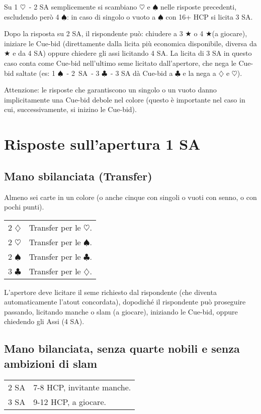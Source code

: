 \documentclass[a4paper,10pt]{article}
\renewcommand{\c}{$\clubsuit$\xspace}
\renewcommand{\d}{$\diamondsuit$\xspace}
\newcommand{\h}{$\heartsuit$\xspace}
\newcommand{\s}{$\spadesuit$\xspace}
\renewcommand{\j}{$\bigstar$\xspace}
\newcommand{\sa}{SA\xspace}
\newcommand{\smallspace}{\vskip0.3cm}
\newenvironment{twocol}
  {\smallspace\noindent\begin{tabular}{l p{0.78\textwidth}}}
  {\end{tabular}\smallspace}
\begin{document}
\noindent Su 1 \h\ - 2 \sa semplicemente si scambiano \h e \s nelle risposte precedenti, escludendo però 4 \s: in caso di singolo o vuoto a \s con 16+ HCP si licita 3 \sa.

Dopo la risposta su 2 \sa, il rispondente può: chiudere a 3 \j o 4 \j (a giocare), iniziare le Cue-bid (direttamente dalla licita più economica disponibile, diversa da \j e da 4 \sa) oppure chiedere gli assi licitando 4 \sa. La licita di 3 \sa in questo caso conta come Cue-bid nell'ultimo seme licitato dall'apertore, che nega le Cue-bid saltate (es: 1 \s\ - \mbox{2 \sa}\ - 3 \c\ - 3 \sa dà Cue-bid a \c e la nega a \d e \h).

Attenzione: le risposte che garantiscono un singolo o un vuoto danno implicitamente una Cue-bid debole nel colore (questo è importante nel caso in cui, successivamente, si inizino le Cue-bid).

\pagebreak

\section{Risposte sull'apertura 1 SA}

\subsection{Mano sbilanciata (Transfer)}

Almeno sei carte in un colore (o anche cinque con singoli o vuoti con senno, o con pochi punti).

\begin{twocol}
 2 \d & Transfer per le \h.\\
 2 \h & Transfer per le \s.\\
 2 \s & Transfer per le \c.\\
 3 \c & Transfer per le \d.\\
\end{twocol}

L'apertore deve licitare il seme richiesto dal rispondente (che diventa automaticamente l'atout concordata), dopodiché il rispondente può proseguire passando, licitando manche o slam (a giocare), iniziando le Cue-bid, oppure chiedendo gli Assi (4 \sa).


\subsection{Mano bilanciata, senza quarte nobili e senza ambizioni di slam}

\begin{twocol}
 2 \sa & 7-8 HCP, invitante manche.\\
 3 \sa & 9-12 HCP, a giocare.
\end{twocol}
\end{document}
